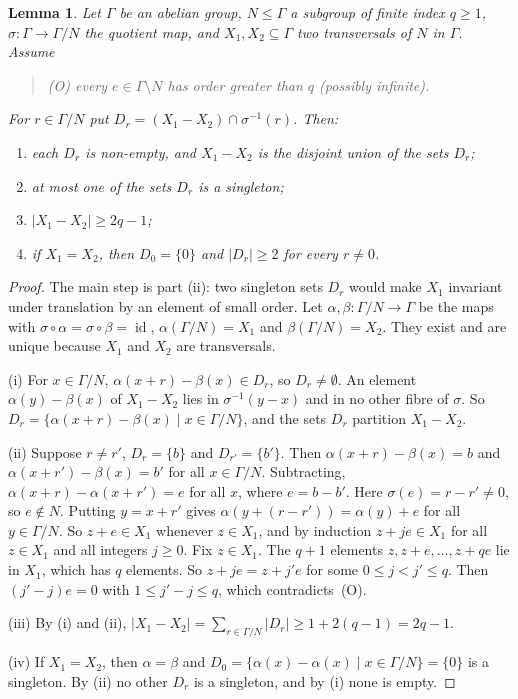 \documentclass[11pt]{amsart}
\newtheorem{lemma}[theorem]{Lemma}
\theoremstyle{definition}\newtheorem{definition}[theorem]{Definition}
\theoremstyle{remark}\newtheorem{remark}[theorem]{Remark}
\newcommand{\abs}[1]{\lvert #1\rvert}
\DeclareMathOperator{\id}{id}
\begin{document}
\begin{lemma}\label{lem:cross}
Let \(\Gamma\) be an abelian group, \(N\le \Gamma\) a subgroup of finite index \(q\ge1\), \(\sigma\colon \Gamma\to \Gamma/N\) the quotient map, and \(X_1,X_2\subseteq \Gamma\) two transversals of \(N\) in \(\Gamma\).
Assume
\begin{quote}
\textup{(O)} every \(e\in \Gamma\setminus N\) has order greater than \(q\) (possibly infinite).
\end{quote}
For \(r\in \Gamma/N\) put \(D_r=(X_1-X_2)\cap\sigma^{-1}(r)\). Then:
\begin{enumerate}
\item[(i)] each \(D_r\) is non-empty, and \(X_1-X_2\) is the disjoint union of the sets \(D_r\);
\item[(ii)] at most one of the sets \(D_r\) is a singleton;
\item[(iii)] \(\abs{X_1-X_2}\ge2q-1\);
\item[(iv)] if \(X_1=X_2\), then \(D_0=\{0\}\) and \(\abs{D_r}\ge2\) for every \(r\ne0\).
\end{enumerate}
\end{lemma}

\begin{proof}
The main step is part (ii): two singleton sets \(D_r\) would make \(X_1\) invariant under translation by an element of small order.
Let \(\alpha,\beta\colon \Gamma/N\to \Gamma\) be the maps with \(\sigma\circ\alpha=\sigma\circ\beta=\id\), \(\alpha(\Gamma/N)=X_1\) and \(\beta(\Gamma/N)=X_2\).
They exist and are unique because \(X_1\) and \(X_2\) are transversals.

(i) For \(x\in \Gamma/N\), \(\alpha(x+r)-\beta(x)\in D_r\), so \(D_r\ne\emptyset\).
An element \(\alpha(y)-\beta(x)\) of \(X_1-X_2\) lies in \(\sigma^{-1}(y-x)\) and in no other fibre of \(\sigma\).
So \(D_r=\{\alpha(x+r)-\beta(x)\mid x\in \Gamma/N\}\), and the sets \(D_r\) partition \(X_1-X_2\).

(ii) Suppose \(r\ne r'\), \(D_r=\{b\}\) and \(D_{r'}=\{b'\}\).
Then \(\alpha(x+r)-\beta(x)=b\) and \(\alpha(x+r')-\beta(x)=b'\) for all \(x\in \Gamma/N\).
Subtracting, \(\alpha(x+r)-\alpha(x+r')=e\) for all \(x\), where \(e=b-b'\).
Here \(\sigma(e)=r-r'\ne0\), so \(e\notin N\).
Putting \(y=x+r'\) gives \(\alpha(y+(r-r'))=\alpha(y)+e\) for all \(y\in \Gamma/N\).
So \(z+e\in X_1\) whenever \(z\in X_1\), and by induction \(z+je\in X_1\) for all \(z\in X_1\) and all integers \(j\ge0\).
Fix \(z\in X_1\).
The \(q+1\) elements \(z,z+e,\dots,z+qe\) lie in \(X_1\), which has \(q\) elements.
So \(z+je=z+j'e\) for some \(0\le j<j'\le q\).
Then \((j'-j)e=0\) with \(1\le j'-j\le q\), which contradicts~(O).

(iii) By (i) and (ii), \(\abs{X_1-X_2}=\sum_{r\in \Gamma/N}\abs{D_r}\ge1+2(q-1)=2q-1\).

(iv) If \(X_1=X_2\), then \(\alpha=\beta\) and \(D_0=\{\alpha(x)-\alpha(x)\mid x\in \Gamma/N\}=\{0\}\) is a singleton.
By (ii) no other \(D_r\) is a singleton, and by (i) none is empty.
\end{proof}
\end{document}
